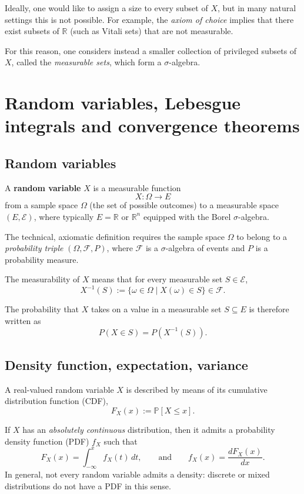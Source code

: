 \par
Ideally, one would like to assign a size to every subset of $X$, but in many natural settings this is not possible. For example, the \textit{axiom of choice} implies that there exist subsets of $\mathbb{R}$ (such as Vitali sets) that are not measurable.

\par
For this reason, one considers instead a smaller collection of privileged subsets of $X$, called the \textit{measurable sets}, which form a $\sigma$-algebra.

\section{Random variables, Lebesgue integrals and convergence theorems}
\subsection{Random variables}

A \textbf{random variable} $X$ is a measurable function
\[
X : \Omega \to E
\]
from a sample space $\Omega$ (the set of possible outcomes) to a measurable space $(E, \mathcal{E})$, where typically $E = \mathbb{R}$ or $\mathbb{R}^n$ equipped with the Borel $\sigma$-algebra.

\par
The technical, axiomatic definition requires the sample space $\Omega$ to belong to a \textit{probability triple} $(\Omega, \mathcal{F}, P)$, where $\mathcal{F}$ is a $\sigma$-algebra of events and $P$ is a probability measure.

\par
The measurability of $X$ means that for every measurable set $S \in \mathcal{E}$,
\[
X^{-1}(S) := \{ \omega \in \Omega \mid X(\omega) \in S \} \in \mathcal{F}.
\]

\par
The probability that $X$ takes on a value in a measurable set $S \subseteq E$ is therefore written as
\[
P(X \in S) = P(X^{-1}(S)).
\]
\subsection{Density function, expectation, variance}

A real-valued random variable $X$ is described by means of its cumulative distribution function (CDF),
\[
F_X(x) := \mathbb{P}[X \leq x].
\]

\par
If $X$ has an \textit{absolutely continuous} distribution, then it admits a probability density function (PDF) $f_X$ such that
\[
F_X(x) = \int_{-\infty}^{x} f_X(t)\,dt, \qquad \text{and} \qquad f_X(x) = \frac{dF_X(x)}{dx}.
\]
In general, not every random variable admits a density: discrete or mixed distributions do not have a PDF in this sense.

